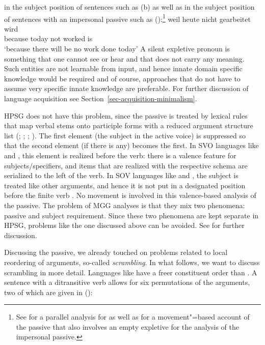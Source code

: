 \documentclass[output=paper,biblatex,babelshorthands,newtxmath,draftmode,colorlinks,citecolor=brown]{langscibook}
\begin{document}
in the subject position of sentences such as (b) as well as in the subject position of sentences with an
impersonal passive such as ():\footnote{%
	See  for a parallel analysis for  as well as 
	 for a movement"=based account of the passive that also involves an
        empty expletive for the analysis of the impersonal passive.
}
\ea
\gll weil heute nicht gearbeitet wird\\
     because today not worked is\\
\glt `because there will be no work done today'
\z
A silent expletive pronoun is something that one cannot see or hear and that does not carry any
meaning. Such entities are not learnable from input, and hence innate domain specific knowledge would
be required and of course, approaches that do not have to assume very specific innate knowledge are
preferable. For further discussion of language acquisition see Section~\ref{sec-acquisition-minimalism}.%

\largerpage[1]
HPSG does not have this problem, since the passive is treated by lexical rules that map verbal stems onto
participle forms with a reduced argument structure list (\citealt[]{ps};
\citealt{Mueller2003e}; \citealt{MOe2013a}; ). The first element (the subject in the
active voice) is suppressed so that the second element (if there is any) becomes the first. In SVO languages
like  and , this element is realized before the verb: there is a valence feature for
subjects/specifiers, and items that are realized with the respective schema are serialized to the
left of the verb. In SOV languages like  and , the subject is treated like other arguments,
and hence it is not put in a designated position before the finite verb . No movement is
involved in this valence-based analysis of the passive. The problem of MGG analyses is that they mix two phenomena: passive and subject
requirement. Since these two phenomena are kept separate in HPSG, problems like the one discussed
above can be avoided. See  for further discussion.


Discussing the passive, we already touched on problems related to local reordering of arguments,
so-called \emph{scrambling}. In what follows, we want
to discuss scrambling in more detail. Languages like  have a freer constituent
order than . A sentence with a ditransitive verb allows for six permutations of
the arguments, two of which are given in ():
\end{document}
